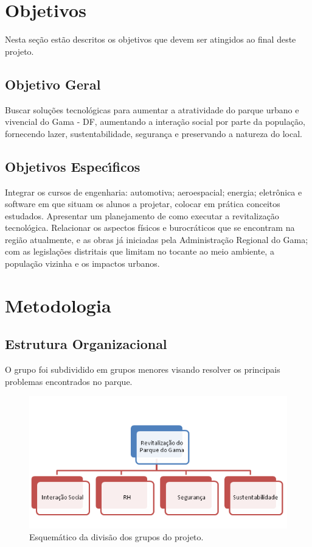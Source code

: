 \section{Objetivos}

Nesta se\c{c}\~ao est\~ao descritos os objetivos que devem ser atingidos ao final deste projeto.

\subsection{Objetivo Geral}

Buscar solu\c{c}\~oes tecnol\'ogicas para aumentar a atratividade do parque urbano e vivencial do Gama - DF, aumentando a intera\c{c}\~ao social por parte da popula\c{c}\~ao, fornecendo lazer, sustentabilidade, seguran\c{c}a e preservando a natureza do local. 

\subsection{Objetivos Espec\'{\i}ficos}

Integrar os cursos de engenharia: automotiva; aeroespacial; energia; eletr\^onica e software em que situam os alunos a projetar, colocar em pr\'atica conceitos estudados. 
Apresentar um planejamento de como executar a revitaliza\c{c}\~ao tecnol\'ogica. Relacionar os aspectos f\'isicos e burocr\'aticos que se encontram na regi\~ao atualmente, e as obras j\'a iniciadas pela Administra\c{c}\~ao Regional do Gama; com as legisla\c{c}\~oes distritais que limitam no tocante ao meio ambiente, a popula\c{c}\~ao vizinha e os impactos urbanos. 

\section{Metodologia}

\subsection{Estrutura Organizacional}

O grupo foi subdividido em grupos menores visando resolver os principais problemas encontrados no parque.

\begin{figure}[H]
	\centering
	\label{Estrutura Organizacional}
		\includegraphics[keepaspectratio=true,scale=1.0]{planejamento/EstruturaOrganizacional.png}
	\caption{Esquem\'atico da divis\~ao dos grupos do projeto.}
\end{figure}

